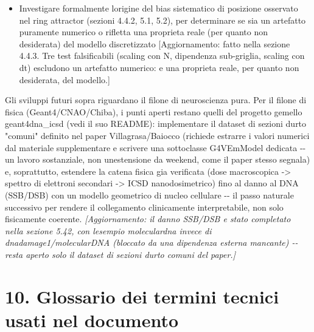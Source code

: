 \documentclass[
  italian,
]{article}
\begin{document}
\begin{itemize}
  Testare l\textquotesingle accesso a un cluster di calcolo universitario (ad esempio tramite il CNAO o il Dipartimento di Fisica dell\textquotesingle Universita\textquotesingle{} di Pavia) per superare il limite di RAM di un laptop personale, verificato empiricamente nella sezione 3.3 attorno ai 40-50 milioni di neuroni con connettivita\textquotesingle{} casuale semplice
\item
  Investigare formalmente l\textquotesingle origine del bias sistematico di posizione osservato nel ring attractor (sezioni 4.4.2, 5.1, 5.2), per determinare se sia un artefatto puramente numerico o rifletta una proprieta\textquotesingle{} reale (per quanto non desiderata) del modello discretizzato {[}Aggiornamento: fatto nella sezione 4.4.3. Tre test falsificabili (scaling con N, dipendenza sub-griglia, scaling con dt) escludono un artefatto numerico: e\textquotesingle{} una proprieta\textquotesingle{} reale, per quanto non desiderata, del modello.{]}
\end{itemize}

Gli sviluppi futuri sopra riguardano il filone di neuroscienza pura. Per il filone di fisica (Geant4/CNAO/Chiba), i punti aperti restano quelli del progetto gemello geant4dna\_\allowbreak{}icsd (vedi il suo README): implementare il dataset di sezioni d\textquotesingle urto "comuni" definito nel paper Villagrasa/Baiocco (richiede estrarre i valori numerici dal materiale supplementare e scrivere una sottoclasse G4VEmModel dedicata -\/- un lavoro sostanziale, non un\textquotesingle estensione da weekend, come il paper stesso segnala) e, soprattutto, estendere la catena fisica gia\textquotesingle{} verificata (dose macroscopica -\textgreater{} spettro di elettroni secondari -\textgreater{} ICSD nanodosimetrico) fino al danno al DNA (SSB/DSB) con un modello geometrico di nucleo cellulare -\/- il passo naturale successivo per rendere il collegamento clinicamente interpretabile, non solo fisicamente coerente. \emph{{[}Aggiornamento: il danno SSB/DSB e\textquotesingle{} stato completato nella sezione 5.42, con l\textquotesingle esempio moleculardna invece di dnadamage1/molecularDNA (bloccato da una dipendenza esterna mancante) -\/- resta aperto solo il dataset di sezioni d\textquotesingle urto comuni del paper.{]}}

\section{10. Glossario dei termini tecnici usati nel documento}\label{glossario-dei-termini-tecnici-usati-nel-documento}
\end{document}
